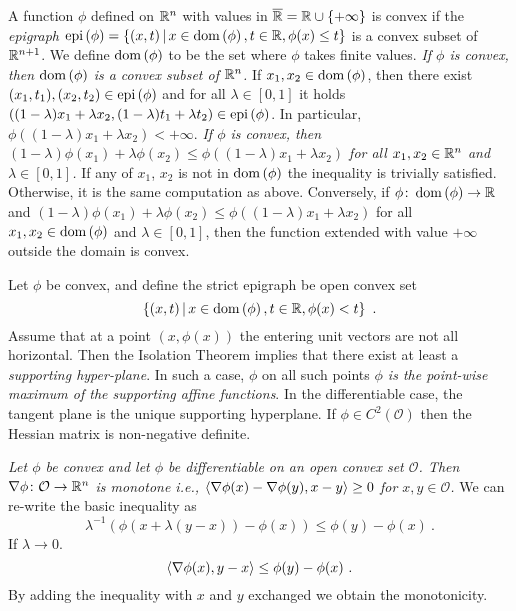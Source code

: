 \documentclass[12pt,a4paper]{amsart}
\theoremstyle{plain}%
\theoremstyle{definition}
\theoremstyle{remark}
\begin{document}
A function $\phi$ defined on $\mathbb{R}^n$ with values in $\overline{\mathbb{R}} = \mathbb{R} \cup \left\{+\infty\right\}$ is convex if the \emph{epigraph} $\operatorname{epi}\left(\phi\right) = \left\{(x,t) \, \middle| \,  x \in \operatorname{dom}\left(\phi\right), t \in \mathbb{R}, \phi(x) \leq t \right\}$ is a convex subset of $\mathbb{R}^{n+1}$. We define $\operatorname{dom}\left(\phi\right)$ to be the set where $\phi$ takes finite values. \emph{If $\phi$ is convex, then $\operatorname{dom}\left(\phi\right)$ is a convex subset of $\mathbb{R}^n$.} If $x_1,x_2 \in \operatorname{dom}\left(\phi\right)$, then there exist $(x_1,t_1), (x_2,t_2) \in \operatorname{epi}\left(\phi\right)$ and for all $\lambda \in [0,1]$ it holds $((1-\lambda)x_1+\lambda x_2,(1-\lambda)t_1+\lambda t_2) \in \operatorname{epi}\left(\phi\right)$. In particular, $\phi((1-\lambda)x_1+\lambda x_2) < + \infty$. \emph{If $\phi$ is  convex, then $(1-\lambda)\phi(x_1) + \lambda \phi(x_2) \leq \phi((1-\lambda)x_1+\lambda x_2)$ for all $x_1,x_2 \in \mathbb{R}^n$ and $\lambda \in [0,1]$.} If any of $x_1$, $x_2$ is not in $\operatorname{dom}\left(\phi\right)$ the inequality is trivially satisfied. Otherwise, it is the same computation as above. Conversely, if $\phi \colon \operatorname{dom}\left(\phi\right) \to \mathbb{R}$ and $(1-\lambda)\phi(x_1) + \lambda \phi(x_2) \leq \phi((1-\lambda)x_1+\lambda x_2)$ for all $x_1,x_2 \in \operatorname{dom}\left(\phi\right)$ and $\lambda \in [0,1]$, then the function extended with value $+\infty$ outside the domain is convex.

Let $\phi$ be convex, and define the strict epigraph be open convex set
\begin{equation*}
\left\{(x,t) \, \middle| \,  x \in \operatorname{dom}\left(\phi\right), t \in \mathbb{R}, \phi(x) < t \right\} \ .
\end{equation*}
Assume that at a point $(x,\phi(x))$ the entering unit vectors are not all horizontal. Then the Isolation Theorem implies that there exist at least a \emph{supporting hyper-plane}. In such a case, $\phi$ on all such points \emph{$\phi$ is the point-wise maximum of the supporting affine functions}. In the differentiable case, the tangent plane is the unique supporting hyperplane. If $\phi \in C^2(\mathcal O)$ then the Hessian matrix is non-negative definite.

\emph{Let $\phi$ be convex and let $\phi$ be differentiable on an open convex set $\mathcal O$. Then $\nabla \phi \colon \mathcal O \to \mathbb{R}^n$ is \emph{monotone} i.e., $\left\langle\nabla \phi(x) - \nabla \phi(y),x-y\right\rangle \geq 0$ for $x,y \in \mathcal O$.} We can re-write the basic inequality as
\begin{equation*}
  \lambda^{-1}\left(\phi(x + \lambda(y-x))-\phi(x)\right) \leq \phi(y) - \phi(x) \ . 
\end{equation*}
If $\lambda \to 0$.
\begin{equation*}
  \left\langle\nabla \phi(x),y-x\right\rangle \leq \phi(y) - \phi(x) \ .
\end{equation*}
By adding the inequality with $x$ and $y$ exchanged we obtain the monotonicity.
\end{document}
